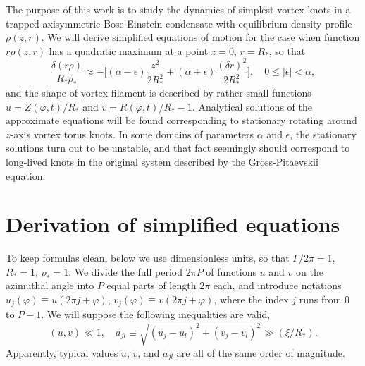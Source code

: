 \documentclass[pra,twocolumn,showpacs]{revtex4}
\begin{document}
The purpose of this work is to study the dynamics of simplest vortex knots in a trapped axisymmetric
Bose-Einstein condensate with equilibrium density profile $\rho(z,r)$. We will derive simplified
equations of motion for the case when function  $r\rho(z,r)$ has a quadratic maximum at a point 
$z=0$, $r=R_*$, so that
$$
\frac{\delta(r\rho)}{R_*\rho_*}\approx -\Big[(\alpha-\epsilon) \frac{z^2}{2R_*^2} 
+(\alpha+\epsilon) \frac{(\delta r)^2}{2R_*^2}\Big], \quad 0\le|\epsilon|<\alpha,
$$
and the shape of vortex filament is described by rather small functions $u=Z(\varphi,t)/R_*$
and $v=R(\varphi,t)/R_* -1$. Analytical solutions of the approximate equations will be found
corresponding to stationary rotating around $z$-axis vortex torus knots. In some domains of 
parameters $\alpha$ and $\epsilon$, the stationary solutions turn out to be unstable,
and that fact seemingly should correspond to long-lived knots in the original system described 
by the Gross-Pitaevskii equation.


\section{Derivation of simplified equations} 

To keep formulas clean, below we use dimensionless units, so that $\Gamma/{2\pi}=1$, $R_* = 1$, 
$\rho_*=1$. We divide the full period $2\pi P$ of functions $u$ and $v$ on the azimuthal angle into $P$ 
equal parts of length $2\pi$ each, and introduce notations $u_j(\varphi)\equiv u(2\pi j+\varphi)$, 
$v_j(\varphi)\equiv v(2\pi j+\varphi)$, where the index $j$ runs from $0$ to $P-1$. We will suppose
the following inequalities are valid,
$$
(u,v)\ll 1, \quad a_{jl}\equiv\sqrt{(u_j-u_l)^2+(v_j-v_l)^2}\gg(\xi/R_*).
$$
Apparently, typical values $\tilde u$, $\tilde v$, and $\tilde a_{jl}$ are all of the same order of magnitude.
\end{document}
